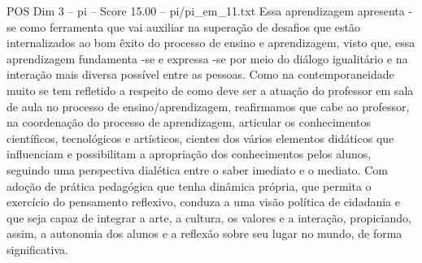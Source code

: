 \begin{textsample}{POS Dim 3 – pi – Score 15.00 – pi/pi\_em\_11.txt}
Essa aprendizagem apresenta -se como ferramenta que vai auxiliar na superação de desafios que estão internalizados ao bom êxito do processo de ensino e aprendizagem, visto que, essa aprendizagem fundamenta -se e expressa -se por meio do diálogo igualitário e na interação mais diversa possível entre as pessoas.
Como na contemporaneidade muito se tem refletido a respeito de como deve ser a atuação do professor em sala de aula no processo de ensino/aprendizagem, reafirmamos que cabe ao professor, na coordenação do processo de aprendizagem, articular os conhecimentos científicos, tecnológicos e artísticos, cientes dos vários elementos didáticos que influenciam e possibilitam a apropriação dos conhecimentos pelos alunos, seguindo uma perspectiva dialética entre o saber imediato e o mediato.
Com adoção de prática pedagógica que tenha dinâmica própria, que permita o exercício do pensamento reflexivo, conduza a uma visão política de cidadania e que seja capaz de integrar a arte, a cultura, os valores e a interação, propiciando, assim, a autonomia dos alunos e a reflexão sobre seu lugar no mundo, de forma significativa.

\end{textsample}
